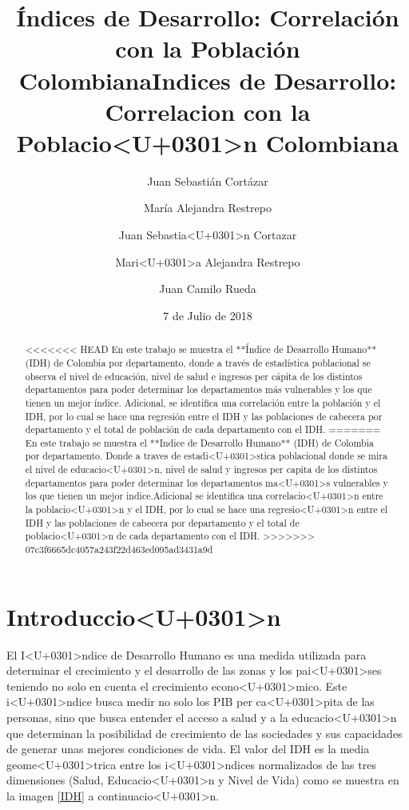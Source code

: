 \documentclass{article}
\title{Índices de Desarrollo: Correlación con la Población Colombiana}
\author[1]{\normalsize Juan Sebastián Cortázar}
\author[2]{\normalsize María Alejandra Restrepo}
\title{Indices de Desarrollo: Correlacion con la Poblacio<U+0301>n Colombiana}
\author[1]{\normalsize Juan Sebastia<U+0301>n Cortazar}
\author[2]{\normalsize Mari<U+0301>a Alejandra Restrepo}
\author[3]{\normalsize Juan Camilo Rueda}
\affil[1,2,3]{\small  Universidad de los Andes\\
\texttt{{js.cortazar533,ma.restrepot,jc.rueda169}@uniandes.edu.col}}
\date{7 de Julio de 2018}
\begin{document}


\maketitle


\begin{abstract}
<<<<<<< HEAD
En este trabajo se muestra el **Índice de Desarrollo Humano** (IDH) de Colombia por departamento, donde a través de estadística poblacional se observa el nivel de educación, nivel de salud e ingresos per cápita de los distintos departamentos para poder determinar los departamentos más vulnerables y los que tienen un mejor índice. Adicional, se identifica una correlación entre la población y el IDH, por lo cual se hace una regresión entre el IDH y las poblaciones de cabecera por departamento y el total de población de cada departamento con el IDH.
=======
En este trabajo se muestra el **Indice de Desarrollo Humano** (IDH) de Colombia por departamento. Donde a traves de estadi<U+0301>stica poblacional donde se mira el nivel de educacio<U+0301>n, nivel de salud y ingresos per capita de los distintos departamentos para poder determinar los departamentos ma<U+0301>s vulnerables y los que tienen un mejor indice.Adicional se identifica una correlacio<U+0301>n entre la poblacio<U+0301>n y el IDH, por lo cual se hace una regresio<U+0301>n entre el IDH y las poblaciones de cabecera por departamento y el total de poblacio<U+0301>n de cada departamento con el IDH. 
>>>>>>> 07c3f6665dc4057a243f22d463ed095ad3431a9d
\end{abstract}

\section*{Introduccio<U+0301>n}

El I<U+0301>ndice de Desarrollo Humano es una medida utilizada para determinar el crecimiento y el desarrollo de las zonas y los pai<U+0301>ses teniendo no solo en cuenta el crecimiento econo<U+0301>mico. Este i<U+0301>ndice busca medir no solo los PIB per ca<U+0301>pita de las personas, sino que busca entender el acceso a salud y a la educacio<U+0301>n que determinan la posibilidad de crecimiento de las sociedades y sus capacidades de generar unas mejores condiciones de vida. 
El valor del IDH es la media geome<U+0301>trica entre los i<U+0301>ndices normalizados de las tres dimensiones (Salud, Educacio<U+0301>n y Nivel de Vida) como se muestra en la imagen \ref{IDH} a continuacio<U+0301>n. 
\end{document}
